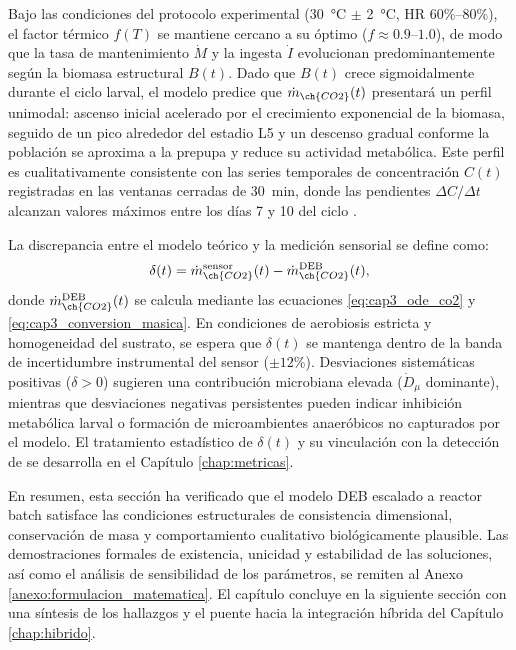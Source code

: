 Bajo las condiciones del protocolo experimental (\SI{30}{\celsius} $\pm$ \SI{2}{\celsius}, HR $60\%$--$80\%$), el factor térmico $f(T)$ se mantiene cercano a su óptimo ($f \approx 0.9$--$1.0$), de modo que la tasa de mantenimiento $\dot{M}$ y la ingesta $\dot{I}$ evolucionan predominantemente según la biomasa estructural $B(t)$. Dado que $B(t)$ crece sigmoidalmente durante el ciclo larval, el modelo predice que $\dot{m}_{\ch{CO2}}(t)$ presentará un perfil unimodal: ascenso inicial acelerado por el crecimiento exponencial de la biomasa, seguido de un pico alrededor del estadio L5 y un descenso gradual conforme la población se aproxima a la prepupa y reduce su actividad metabólica. Este perfil es cualitativamente consistente con las series temporales de concentración $C(t)$ registradas en las ventanas cerradas de \SI{30}{\minute}, donde las pendientes $\Delta C/\Delta t$ alcanzan valores máximos entre los días 7 y 10 del ciclo \parencite{rossiEstimatingDynamicsGreenhouse2024a}.

La discrepancia entre el modelo teórico y la medición sensorial se define como:
\begin{equation}
    \delta(t) = \dot{m}_{\ch{CO2}}^{\mathrm{sensor}}(t) - \dot{m}_{\ch{CO2}}^{\mathrm{DEB}}(t),
    \label{eq:cap3_discrepancia}
\end{equation}
donde $\dot{m}_{\ch{CO2}}^{\mathrm{DEB}}(t)$ se calcula mediante las ecuaciones \eqref{eq:cap3_ode_co2} y \eqref{eq:cap3_conversion_masica}. En condiciones de aerobiosis estricta y homogeneidad del sustrato, se espera que $\delta(t)$ se mantenga dentro de la banda de incertidumbre instrumental del sensor ($\pm 12\%$). Desviaciones sistemáticas positivas ($\delta > 0$) sugieren una contribución microbiana elevada ($\dot{D}_{\mu}$ dominante), mientras que desviaciones negativas persistentes pueden indicar inhibición metabólica larval o formación de microambientes anaeróbicos no capturados por el modelo. El tratamiento estadístico de $\delta(t)$ y su vinculación con la detección de  se desarrolla en el Capítulo \ref{chap:metricas}.

En resumen, esta sección ha verificado que el modelo DEB escalado a reactor batch satisface las condiciones estructurales de consistencia dimensional, conservación de masa y comportamiento cualitativo biológicamente plausible. Las demostraciones formales de existencia, unicidad y estabilidad de las soluciones, así como el análisis de sensibilidad de los parámetros, se remiten al Anexo \ref{anexo:formulacion_matematica}. El capítulo concluye en la siguiente sección con una síntesis de los hallazgos y el puente hacia la integración híbrida del Capítulo \ref{chap:hibrido}.
